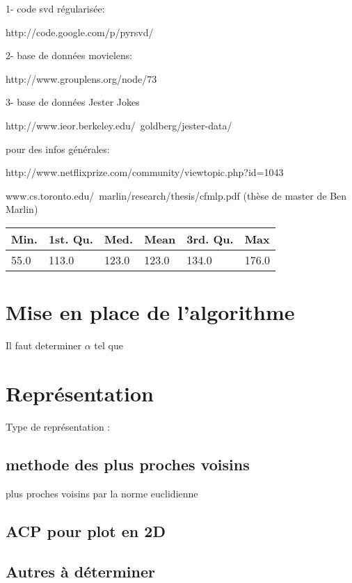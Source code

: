 \documentclass[a4paper]{article}
\newenvironment{Figure}
  {\par\medskip\noindent\minipage{\linewidth}}
  {\endminipage\par\medskip}
\begin{document}
1- code svd régularisée:

http://code.google.com/p/pyrsvd/

2- base de données movielens:

http://www.grouplens.org/node/73

3- base de données Jester Jokes

http://www.ieor.berkeley.edu/~goldberg/jester-data/

pour des infos générales:

http://www.netflixprize.com/community/viewtopic.php?id=1043

www.cs.toronto.edu/~marlin/research/thesis/cfmlp.pdf
(thèse de master de Ben Marlin)

\begin{Figure}
 \centering
\begin{tabular}{|l|l|l|l|l|l|}
   \hline
   Min. & 1st. Qu. & Med. & Mean & 3rd. Qu. & Max \\
   \hline
55.0 & 113.0 & 123.0 & 123.0 & 134.0 & 176.0\\
\hline
\end{tabular}
\end{Figure}





\section{Mise en place de l'algorithme}

Il faut determiner $\alpha$ tel que 


\section{Représentation}
Type de représentation :
\subsection{methode des plus proches voisins}
plus proches voisins par la norme euclidienne


\subsection{ACP pour plot en 2D}


\subsection{Autres à déterminer}

\end{document}
